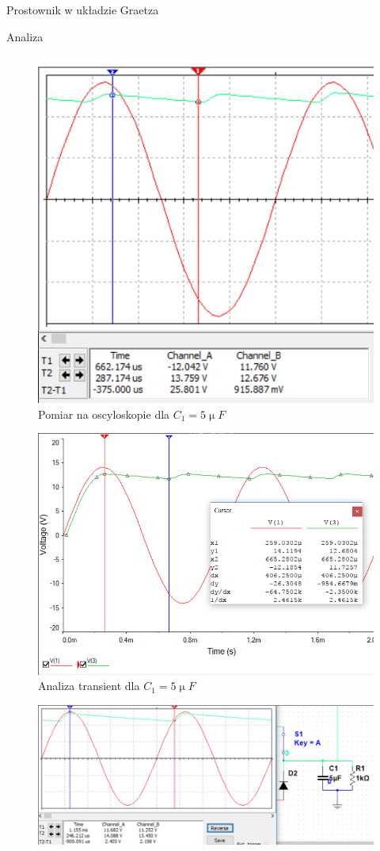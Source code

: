 \documentclass[a4paper]{scrartcl}
\begin{document}
\begin{section}{Prostownik w układzie Graetza}
\begin{subsection}{Analiza}
\begin{table}[ht]
\begin{center}
\begin{tabular}{| >{\bfseries}p{4.5cm} | l | l | l | l |}
					\end{tabular}
					\end{center}
				\end{table}
				\begin{figure}[h]
				\begin{center}
					\includegraphics[width=0.39\linewidth,scale=2]{exercise-3-osciloscope}
					\caption{Pomiar na oscyloskopie dla $C_{1} = 5\upmu F$}
					\label{fig:circuit-3-osc}
				\end{center}
				\end{figure}
				\pagebreak
				\begin{figure}[!ht]
				\begin{center}
					\includegraphics[width=0.7\linewidth,scale=2]{exercise-3-transient}
					\caption{Analiza transient dla $C_{1} = 5\upmu F$}
					\label{fig:circuit-3-transient}
				\end{center}
				\end{figure}
				\begin{figure}[!ht]
				\begin{center}
					\includegraphics[width=0.7\linewidth,scale=2]{exercise-3-diode-fail}

\end{center}
\end{figure}
\end{subsection}
\end{section}
\end{document}
